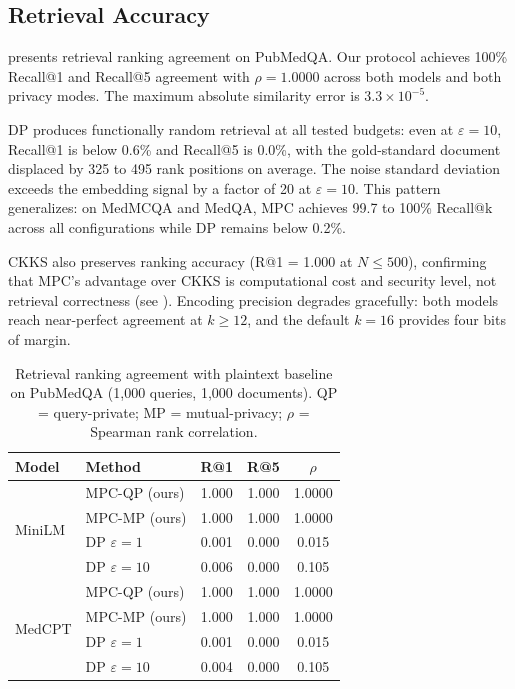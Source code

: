 \documentclass[conference]{IEEEtran}
\begin{document}
\subsection{Retrieval Accuracy}
\label{sec:exp_accuracy}

 presents retrieval ranking agreement on PubMedQA.
Our protocol achieves 100\% Recall@1 and Recall@5 agreement with
$\rho = 1.0000$ across both models and both privacy modes. The maximum
absolute similarity error is $3.3 \times 10^{-5}$.

DP produces functionally random retrieval at all tested budgets: even at
$\varepsilon = 10$, Recall@1 is below 0.6\% and Recall@5 is 0.0\%, with
the gold-standard document displaced by 325 to 495 rank positions on
average. The noise standard deviation exceeds the embedding signal by a
factor of 20 at $\varepsilon = 10$.
This pattern generalizes: on MedMCQA and MedQA, MPC achieves 99.7 to
100\% Recall@k across all configurations while DP remains below 0.2\%.

CKKS also preserves ranking accuracy (R@1 = 1.000 at $N \leq 500$),
confirming that MPC's advantage over CKKS is computational cost and
security level, not retrieval correctness (see ).
Encoding precision degrades gracefully: both models reach near-perfect
agreement at $k \geq 12$, and the default $k = 16$ provides four bits
of margin.

\begin{table}[t]
\caption{Retrieval ranking agreement with plaintext baseline on PubMedQA
(1,000 queries, 1,000 documents). QP = query-private; MP = mutual-privacy;
$\rho$ = Spearman rank correlation.}
\label{tab:accuracy}
\centering
\small
\begin{tabular}{@{}llccc@{}}
\toprule
Model & Method & R@1 & R@5 & $\rho$ \\
\midrule
\multirow{4}{*}{MiniLM}
  & MPC-QP (ours) & 1.000 & 1.000 & 1.0000 \\
  & MPC-MP (ours) & 1.000 & 1.000 & 1.0000 \\
  & DP $\varepsilon{=}1$ & 0.001 & 0.000 & 0.015 \\
  & DP $\varepsilon{=}10$ & 0.006 & 0.000 & 0.105 \\
\midrule
\multirow{4}{*}{MedCPT}
  & MPC-QP (ours) & 1.000 & 1.000 & 1.0000 \\
  & MPC-MP (ours) & 1.000 & 1.000 & 1.0000 \\
  & DP $\varepsilon{=}1$ & 0.001 & 0.000 & 0.015 \\
  & DP $\varepsilon{=}10$ & 0.004 & 0.000 & 0.105 \\
\bottomrule
\end{tabular}
\end{table}
\end{document}
